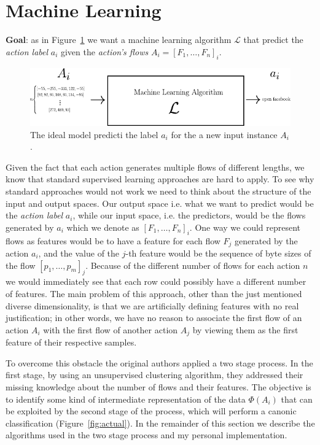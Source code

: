 \section{Machine Learning}
\label{sec:ml}

\textbf{Goal}: as in Figure~\ref{fig:ideal} we want a machine learning algorithm $\mathcal{L}$ that predict the \textit{action label} $a_i$ given the \textit{action's flows} $A_i = [F_1,\dots, F_n]_i$.

\begin{figure}[h]
 \centering
 \includegraphics{images/ideal}
 \caption{\small{The ideal model predicti the label $a_i$ for the a new input instance $A_i$.}}
 \label{fig:ideal}
\end{figure}

Given the fact that each action generates multiple flows of different lengths, we know that standard supervised learning approaches are hard to apply. To see why standard approaches would not work we need to think about the structure of the input and output spaces. Our output space i.e. what we want to predict would be the \textit{action label} $a_i$, while our input space, i.e. the predictors, would be the flows generated by $a_i$ which we denote as $[F_1,\dots,F_n]_i $. One way we could represent flows as features would be to have a feature for each flow $F_j$ generated by the action $a_i$, and the value of the $j$-th feature would be the sequence of byte sizes of the flow $[p_1,\dots, p_m]_j$. Because of the different number of flows for each action  $n$ we would immediately see that each row could possibly have a different number of features. The main problem of this approach, other than the just mentioned diverse dimensionality, is that we are artificially defining features with no real justification; in other words, we have no reason to associate the first flow of an action $A_i$ with the first flow of another action $A_j$ by viewing them as the first feature of their respective samples.


To overcome this obstacle the original authors applied a two stage process. In the first stage, by using an unsupervised clustering algorithm, they addressed their missing knowledge about the number of flows and their features. The objective is to identify some kind of intermediate representation of the data $\Phi(A_i)$ that can be exploited by the second stage of the process, which will perform a canonic classification (Figure~\ref{fig:actual}). 
In the remainder of this section we describe the algorithms used in the two stage process and my personal implementation.

